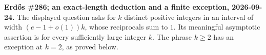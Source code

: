 \textbf{Erd\H{o}s \#286; an exact-length deduction and a finite exception, 2026-09-24.}
The displayed question asks for $k$ distinct positive integers in an interval of width $(e-1+o(1))k$, whose reciprocals sum to $1$. Its meaningful asymptotic assertion is for every sufficiently large integer $k$. The phrase $k\geq2$ has an exception at $k=2$, as proved below.
